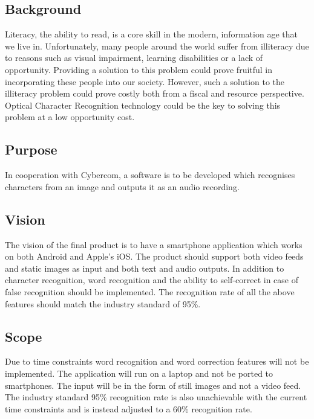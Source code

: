 \documentclass[../main.tex]{subfiles}
\begin{document}
\subsection{Background}
Literacy, the ability to read, is a core skill in the modern, information age
that we live in. Unfortunately, many people around the world suffer from
illiteracy due to reasons such as visual impairment, learning disabilities or
a lack of opportunity. Providing a solution to this problem could prove
fruitful in incorporating these people into our society. However, such a
solution to the illiteracy problem could prove costly both from a fiscal and
resource perspective. Optical Character Recognition technology could be the
key to solving this problem at a low opportunity cost.
\subsection{Purpose}
In cooperation with Cybercom, a software is to be developed which recognises
characters from an image and outputs it as an audio recording.
\subsection{Vision}
The vision of the final product is to have a smartphone application which
works on both Android and Apple’s iOS. The product should support both video
feeds and static images as input and both text and audio outputs. In addition
to character recognition, word recognition and the ability to self-correct in
case of false recognition should be implemented. The recognition rate of all
the above features should match the industry standard of 95\%.

\subsection{Scope}
Due to time constraints word recognition and word correction features will not
 be implemented. The application will run on a laptop and not be ported to
 smartphones. The input will be in the form of still images and not a video
 feed. The industry standard 95\% recognition rate is also unachievable with
 the current time constraints and is instead adjusted to a 60\% recognition
 rate.
\end{document}
